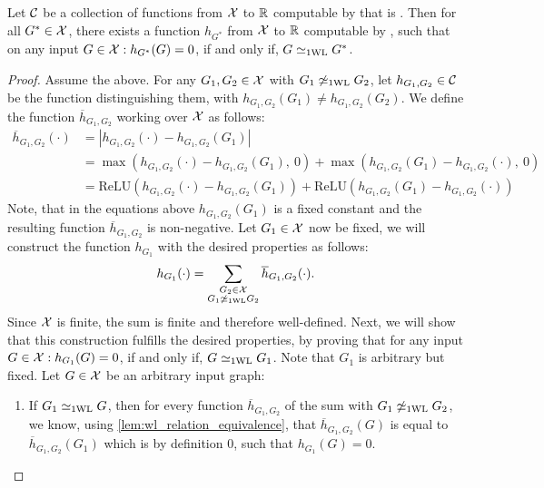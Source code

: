 \begin{lemma}\label{lem:encoding-indicator-func1}
    Let $\mathcal{C}$ be a collection of functions from $\mathcal{X}$ to $\mathbb{R}$ computable by \wlnn that is \wldisc. Then for all $G^* \in \mathcal{X}$, there exists a function $h_{G^*}$ from $\mathcal{X}$ to $\mathbb{R}$ computable by \wlnn, such that on any input $G \in \mathcal{X}: h_{G^*}(G) = 0$, if and only if, $G \simeq_{\text{1WL}} G^*$.
\end{lemma}

\begin{proof}
    Assume the above. For any $G_1, G_2 \in \mathcal{X}$ with $G_1 \not\simeq_{\text{1WL}} G_2$, let $h_{G_1, G_2} \in \mathcal{C}$ be the function distinguishing them, with $h_{G_1, G_2}(G_1) \neq h_{G_1, G_2}(G_2)$. We define the function $\overline{h}_{G_1,G_2}$ working over $\mathcal{X}$ as follows:
    \begin{align}\label{eq:lemma_inidcator_function_1}
        \overline{h}_{G_1, G_2}(\cdot) &= |h_{G_1, G_2}(\cdot) - h_{G_1, G_2}(G_1)| \nonumber\\
        &= \max(h_{G_1, G_2}(\cdot) - h_{G_1, G_2}(G_1), \ 0) + \max(h_{G_1, G_2}(G_1) - h_{G_1, G_2}(\cdot), \ 0) \nonumber\\
        &= \text{ReLU}(h_{G_1, G_2}(\cdot) - h_{G_1, G_2}(G_1)) + \text{ReLU}(h_{G_1, G_2}(G_1) - h_{G_1, G_2}(\cdot))
    \end{align}
    Note, that in the equations above $h_{G_1, G_2}(G_1)$ is a fixed constant and the resulting function $\overline{h}_{G_1, G_2}$ is non-negative.
    Let $G_1 \in \mathcal{X}$ now be fixed, we will construct the function $h_{G_1}$ with the desired properties as follows:
    \begin{align}\label{eq:lemma_inidcator_function_2}
        h_{G_1}(\cdot) = \sum_{\substack{G_2 \in \mathcal{X} \\ G_1 \not\simeq_{\text{1WL}} G_2}} \overline{h}_{G_1, G_2}(\cdot).
    \end{align}
    Since $\mathcal{X}$ is finite, the sum is finite and therefore well-defined. Next, we will show that this construction fulfills the desired properties, by proving that for any input $G \in \mathcal{X}: h_{G_1}(G) = 0$, if and only if, $G \simeq_{\text{1WL}} G_1$. Note that $G_1$ is arbitrary but fixed. Let $G \in \mathcal{X}$ be an arbitrary input graph:
    \begin{enumerate}
        \item If $G_1 \simeq_{\text{1WL}} G$, then for every function $\overline{h}_{G_1, G_2}$ of the sum with $G_1 \not\simeq_{\text{1WL}} G_2$, we know, using \cref{lem:wl_relation_equivalence}, that $\overline{h}_{G_1, G_2}(G)$ is equal to $\overline{h}_{G_1, G_2}(G_1)$ which is by definition $0$, such that $h_{G_1}(G) = 0$.

\end{enumerate}
\end{proof}
